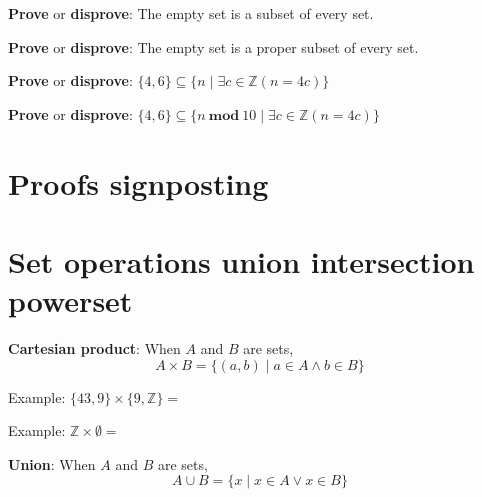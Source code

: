 \documentclass[12pt, oneside]{article}
\begin{document}
{\bf Prove} or {\bf  disprove}: The empty set is a subset of every set.

\vspace{150pt}

{\bf Prove} or {\bf  disprove}: The empty set is a proper subset of every set.

\vspace{150pt}

{\bf Prove} or {\bf  disprove}: $\{ 4, 6 \} \subseteq \{ n \mid  \exists c \in \mathbb{Z} ( n = 4c) \} $

\vspace{150pt}

{\bf Prove} or {\bf  disprove}: $\{ 4, 6 \} \subseteq \{ n ~\textbf{mod}~10 \mid  \exists c \in \mathbb{Z} ( n = 4c) \} $

\vspace{150pt}

 \vfill
\section*{Proofs signposting}


 \vfill
\section*{Set operations union intersection powerset}


{\bf Cartesian product}: When $A$ and  $B$ are sets, 
\[
    A \times  B = \{ (a,b) \mid a \in A  \wedge b  \in B \}
\]

Example: $\{43, 9\} \times  \{9, \mathbb{Z}\}  = $
    
Example: $\mathbb{Z} \times \emptyset  = $

{\bf Union}: When $A$ and  $B$ are sets,
\[
    A \cup  B = \{ x \mid x \in A  \vee x \in B \}
\]    
    
\end{document}
